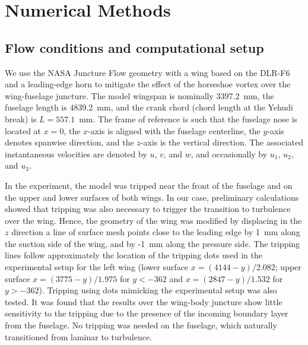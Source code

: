 \documentclass{ctr}
\begin{document}
\section{Numerical Methods}\label{sec:numerical}

\subsection{Flow conditions and computational setup}\label{sec:setup}

We use the NASA Juncture Flow geometry with a wing based on the DLR-F6
and a leading-edge horn to mitigate the effect of the horseshoe vortex
over the wing-fuselage juncture.  The model wingspan is nominally
3397.2~mm, the fuselage length is 4839.2~mm, and the crank chord
(chord length at the Yehudi break) is $L=557.1$~mm. The frame of
reference is such that the fuselage nose is located at $x = 0$, the
$x$-axis is aligned with the fuselage centerline, the $y$-axis denotes
spanwise direction, and the $z$-axis is the vertical direction.  The
associated instantaneous velocities are denoted by $u$, $v$, and $w$,
and occasionally by $u_1$, $u_2$, and $u_3$.

In the experiment, the model was tripped near the front of the
fuselage and on the upper and lower surfaces of both wings.  In our
case, preliminary calculations showed that tripping was also necessary
to trigger the transition to turbulence over the wing. Hence, the
geometry of the wing was modified by displacing in the $z$ direction a
line of surface mesh points close to the leading edge by 1~mm along the
suction side of the wing, and by -1~mm along the pressure side. The
tripping lines follow approximately the location of the tripping dots
used in the experimental setup for the left wing (lower surface $x =
(4144-y)/2.082$; upper surface $x = (3775-y)/1.975$ for $y<-362$ and
$x = (2847-y)/1.532$ for $y>-362$). Tripping using dots mimicking the
experimental setup was also tested.  It was found that the results
over the wing-body juncture show little sensitivity to the tripping
due to the presence of the incoming boundary layer from the
fuselage. No tripping was needed on the fuselage, which naturally
transitioned from laminar to turbulence.
\end{document}
